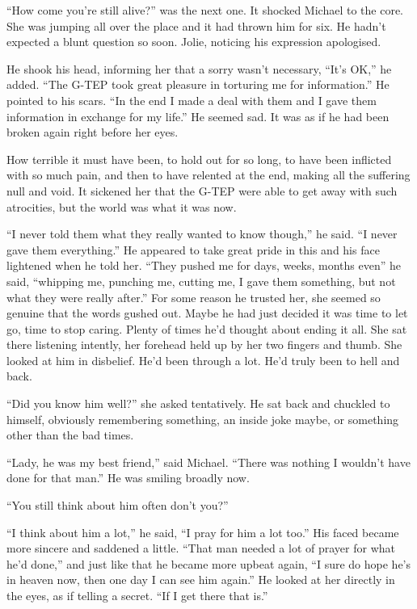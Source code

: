 ``How come you're still alive?'' was the next one.  It shocked Michael to the core.  She was jumping all over the place and it had thrown him for six.  He hadn't expected a blunt question so soon.  Jolie, noticing his expression apologised.  

He shook his head, informing her that a sorry wasn't necessary, ``It's OK,'' he added.  ``The G-TEP took great pleasure  in torturing me for information.''  He pointed to his scars.  ``In the end I made a deal with them and I gave them information in exchange for my life.''  He seemed sad.  It was as if he had been broken again right before her eyes.  

How terrible it must have been, to hold out for so long, to have been inflicted with so much pain, and then to have relented at the end, making all the suffering null and void.  It sickened her that the G-TEP were able to get away with such atrocities, but the world was what it was now.  

``I never told them what they really wanted to know though,'' he said.  ``I never gave them everything.''  He appeared to take great pride in this and his face lightened when he told her.  ``They pushed me for days, weeks, months even'' he said, ``whipping me, punching me, cutting me, I gave them something, but not what they were really after.''  For some reason he trusted her, she seemed so genuine that the words gushed out.  Maybe he had just decided it was time to let go, time to stop caring.  Plenty of times he'd thought about ending it all.  She sat there listening intently, her forehead held up by her two fingers and thumb.  She looked at him in disbelief.  He'd been through a lot.  He'd truly been to hell and back.  

``Did you know him well?'' she asked tentatively.  He sat back and chuckled to himself, obviously remembering something, an inside joke maybe, or something other than the bad times.

``Lady, he was my best friend,'' said Michael.  ``There was nothing I wouldn't have done for that man.''  He was smiling broadly now.

``You still think about him often don't you?''

``I think about him a lot,'' he said, ``I pray for him a lot too.''  His faced became more sincere and saddened a little.  ``That man needed a lot of prayer for what he'd done,'' and just like that he became more upbeat again, ``I sure do hope he's in heaven now, then one day I can see him again.''  He looked at her directly in the eyes, as if telling a secret.  ``If I get there that is.''

